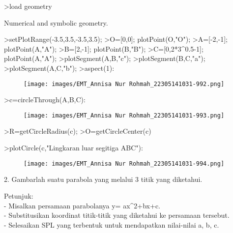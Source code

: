 \documentclass[a4paper,10pt]{article}
\begin{document}
\begin{eulernotebook}
\begin{eulercomment}
\begin{eulercomment}
\begin{eulercomment}
\begin{eulercomment}
\begin{eulercomment}
\end{eulercomment}
\begin{eulerprompt}
>load geometry
\end{eulerprompt}
\begin{euleroutput}
  Numerical and symbolic geometry.
\end{euleroutput}
\begin{eulerprompt}
>setPlotRange(-3.5,3.5,-3.5,3.5);
>O=[0,0]; plotPoint(O,"O");
>A=[-2,-1]; plotPoint(A,"A");
>B=[2,-1]; plotPoint(B,"B");
>C=[0,2*3^0.5-1]; plotPoint(A,"A");
>plotSegment(A,B,"c");
>plotSegment(B,C,"a");
>plotSegment(A,C,"b");
>aspect(1):
\end{eulerprompt}
\begin{figure}[h]
    \centering
    \texttt{[image: images/EMT\_Annisa Nur Rohmah\_22305141031-992.png]}
\end{figure}
\begin{eulerprompt}
>c=circleThrough(A,B,C):
\end{eulerprompt}
\begin{figure}[h]
    \centering
    \texttt{[image: images/EMT\_Annisa Nur Rohmah\_22305141031-993.png]}
\end{figure}
\begin{eulerprompt}
>R=getCircleRadius(c);
>O=getCircleCenter(c)
\end{eulerprompt}
\begin{euleroutput}
  [0,  0.154701]
\end{euleroutput}
\begin{eulerprompt}
>plotCircle(c,"Lingkaran luar segitiga ABC"):
\end{eulerprompt}
\begin{figure}[h]
    \centering
    \texttt{[image: images/EMT\_Annisa Nur Rohmah\_22305141031-994.png]}
\end{figure}
\begin{eulercomment}
2. Gambarlah suatu parabola yang melalui 3 titik yang diketahui.

Petunjuk:\\
- Misalkan persamaan parabolanya y= ax\textasciicircum{}2+bx+c.\\
- Substitusikan koordinat titik-titik yang diketahui ke persamaan
tersebut.\\
- Selesaikan SPL yang terbentuk untuk mendapatkan nilai-nilai a, b, c.


\end{eulercomment}
\end{eulercomment}
\end{eulercomment}
\end{eulercomment}
\end{eulercomment}
\end{eulernotebook}
\end{document}

